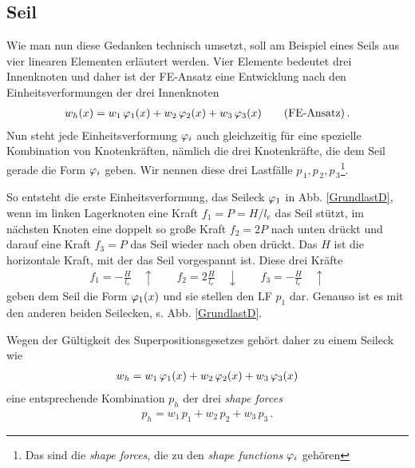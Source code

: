 \vspace{-0.5cm}
{\textcolor{sectionTitleBlue}{\section{Seil}}}\label{Seil}
Wie man nun diese Gedanken technisch umsetzt, soll am Beispiel eines Seils aus vier linearen Elementen erl\"{a}utert werden. Vier Elemente bedeutet drei Innenknoten und daher ist der FE-Ansatz eine Entwicklung nach den Einheitsverformungen der drei Innenknoten
\begin{align}
 w_{h}(x) = w_1\,\varphi_1(x) + w_2\, \varphi_2(x) + w_3 \,\varphi_3(x) \qquad \mbox{(FE-Ansatz)} \,.
\end{align}
Nun steht jede Einheitsverformung $\varphi_i$ auch gleichzeitig f\"{u}r eine spezielle Kombination von Knotenkr\"{a}ften, n\"{a}mlich die drei Knotenkr\"{a}fte, die  dem Seil gerade die Form $\varphi_i$ geben. Wir nennen diese drei Lastf\"{a}lle $p_{\,1}, p_{\,2}, p_{\,3}$\footnote{Das sind die {\em shape forces\/}, die zu den {\em shape functions\/} $\varphi_i$ geh\"{o}ren}.


So entsteht die erste Einheitsverformung, das Seileck $\varphi_1$ in Abb. \ref{GrundlastD}, wenn im linken Lagerknoten eine Kraft $f_1 = P = H/l_e$ das Seil st\"{u}tzt, im n\"{a}chsten Knoten eine doppelt so gro{\ss}e Kraft $f_2 = 2 P$ nach unten dr\"{u}ckt und darauf eine Kraft $f_3 =  P$ das Seil wieder nach oben dr\"{u}ckt. Das $H$ ist die horizontale Kraft, mit der das Seil vorgespannt ist. Diese drei Kr\"{a}fte
\begin{align}
 f_1 = - \frac{H}{l_e} \quad \uparrow  \qquad f_2 = 2 \frac{H}{l_e}\quad \downarrow \qquad f_3 = - \frac{H}{l_e} \quad \uparrow
\end{align}
geben dem Seil die Form $\varphi_1(x)$ und sie stellen den LF $p_1$ dar. Genauso ist es mit den anderen beiden Seilecken, s. Abb. \ref{GrundlastD}.

Wegen der G\"{u}ltigkeit des Superpositionsgesetzes geh\"{o}rt daher zu einem Seileck wie
\begin{align}
 w_{h} = w_1\, \varphi_1(x) + w_2\, \varphi_2(x) + w_3 \,\varphi_3(x)
\end{align}
eine entsprechende Kombination $p_h$ der drei {\em shape forces\/}
\begin{align}
 p_{h} = w_1\, p_1 + w_2\,  p_2 + w_3\, p_3 \,.
\end{align}

